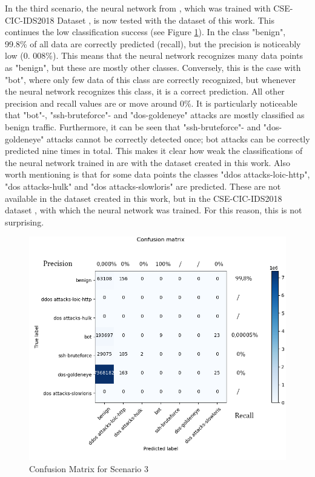\documentclass[conference]{IEEEtran}
\begin{document}
In the third scenario, the neural network from \cite{max1}, which was trained with CSE-CIC-IDS2018 Dataset \cite{max2}, is now tested with the dataset of this work. This continues the low classification success (see Figure \ref{fig:cm3}). In the class "benign", 99.8\% of all data are correctly predicted (recall), but the precision is noticeably low (0. 008\%). This means that the neural network recognizes many data points as "benign", but these are mostly other classes. Conversely, this is the case with "bot", where only few data of this class are correctly recognized, but whenever the neural network recognizes this class, it is a correct prediction. All other precision and recall values are or move around 0\%. It is particularly noticeable that "bot"-, "ssh-bruteforce"- and "dos-goldeneye" attacks are mostly classified as benign traffic. Furthermore, it can be seen that "ssh-bruteforce"- and "dos-goldeneye" attacks cannot be correctly detected once; bot attacks can be correctly predicted nine times in total. This makes it clear how weak the classifications of the neural network trained in \cite{max1} are with the dataset created in this work. Also worth mentioning is that for some data points the classes "ddos attacks-loic-http", "dos attacks-hulk" and "dos attacks-slowloris" are predicted. These are not available in the dataset created in this work, but in the CSE-CIC-IDS2018 dataset \cite{max2}, with which the neural network was trained. For this reason, this is not surprising.

\begin{figure}[htbp]  
\centerline{\includegraphics[scale=0.65]{AltesModellNeueDaten.png}}
\caption{Confusion Matrix for Scenario 3}
\label{fig:cm3}
\end{figure}
\end{document}
